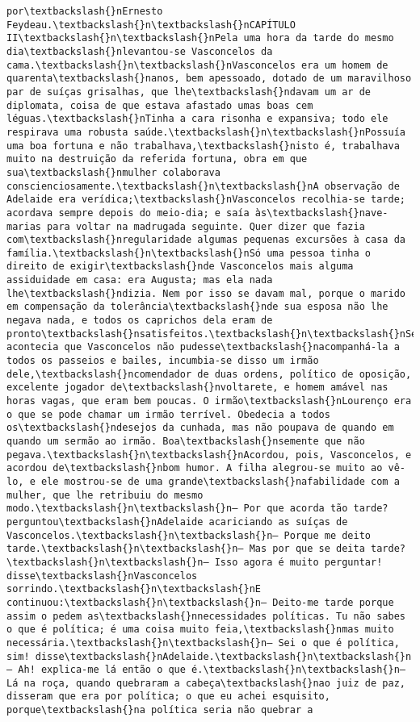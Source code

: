 \begin{Verbatim}[commandchars=\\\{\}]
por\textbackslash{}nErnesto Feydeau.\textbackslash{}n\textbackslash{}nCAPÍTULO II\textbackslash{}n\textbackslash{}nPela uma hora da tarde do mesmo dia\textbackslash{}nlevantou-se Vasconcelos da cama.\textbackslash{}n\textbackslash{}nVasconcelos era um homem de quarenta\textbackslash{}nanos, bem apessoado, dotado de um maravilhoso par de suíças grisalhas, que lhe\textbackslash{}ndavam um ar de diplomata, coisa de que estava afastado umas boas cem léguas.\textbackslash{}nTinha a cara risonha e expansiva; todo ele respirava uma robusta saúde.\textbackslash{}n\textbackslash{}nPossuía uma boa fortuna e não trabalhava,\textbackslash{}nisto é, trabalhava muito na destruição da referida fortuna, obra em que sua\textbackslash{}nmulher colaborava conscienciosamente.\textbackslash{}n\textbackslash{}nA observação de Adelaide era verídica;\textbackslash{}nVasconcelos recolhia-se tarde; acordava sempre depois do meio-dia; e saía às\textbackslash{}nave-marias para voltar na madrugada seguinte. Quer dizer que fazia com\textbackslash{}nregularidade algumas pequenas excursões à casa da família.\textbackslash{}n\textbackslash{}nSó uma pessoa tinha o direito de exigir\textbackslash{}nde Vasconcelos mais alguma assiduidade em casa: era Augusta; mas ela nada lhe\textbackslash{}ndizia. Nem por isso se davam mal, porque o marido em compensação da tolerância\textbackslash{}nde sua esposa não lhe negava nada, e todos os caprichos dela eram de pronto\textbackslash{}nsatisfeitos.\textbackslash{}n\textbackslash{}nSe acontecia que Vasconcelos não pudesse\textbackslash{}nacompanhá-la a todos os passeios e bailes, incumbia-se disso um irmão dele,\textbackslash{}ncomendador de duas ordens, político de oposição, excelente jogador de\textbackslash{}nvoltarete, e homem amável nas horas vagas, que eram bem poucas. O irmão\textbackslash{}nLourenço era o que se pode chamar um irmão terrível. Obedecia a todos os\textbackslash{}ndesejos da cunhada, mas não poupava de quando em quando um sermão ao irmão. Boa\textbackslash{}nsemente que não pegava.\textbackslash{}n\textbackslash{}nAcordou, pois, Vasconcelos, e acordou de\textbackslash{}nbom humor. A filha alegrou-se muito ao vê-lo, e ele mostrou-se de uma grande\textbackslash{}nafabilidade com a mulher, que lhe retribuiu do mesmo modo.\textbackslash{}n\textbackslash{}n— Por que acorda tão tarde? perguntou\textbackslash{}nAdelaide acariciando as suíças de Vasconcelos.\textbackslash{}n\textbackslash{}n— Porque me deito tarde.\textbackslash{}n\textbackslash{}n— Mas por que se deita tarde?\textbackslash{}n\textbackslash{}n— Isso agora é muito perguntar! disse\textbackslash{}nVasconcelos sorrindo.\textbackslash{}n\textbackslash{}nE continuou:\textbackslash{}n\textbackslash{}n— Deito-me tarde porque assim o pedem as\textbackslash{}nnecessidades políticas. Tu não sabes o que é política; é uma coisa muito feia,\textbackslash{}nmas muito necessária.\textbackslash{}n\textbackslash{}n— Sei o que é política, sim! disse\textbackslash{}nAdelaide.\textbackslash{}n\textbackslash{}n— Ah! explica-me lá então o que é.\textbackslash{}n\textbackslash{}n— Lá na roça, quando quebraram a cabeça\textbackslash{}nao juiz de paz, disseram que era por política; o que eu achei esquisito, porque\textbackslash{}na política seria não quebrar a 
\end{Verbatim}
